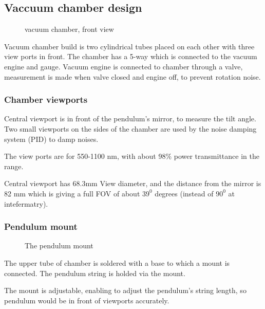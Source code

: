 \documentclass[\main/master.tex]{subfiles}
\begin{document}
\subsection{Vaccuum chamber design}
\begin{figure}[htbp]
	\centering
	\caption[vacuum chamber, front view]{vacuum chamber, front view}
	\label{fig:chamber front}
\end{figure}

\par\noindent
Vacuum chamber build is two cylindrical tubes placed on each other with three view ports in front. The chamber has a 5-way which is connected to the vacuum engine and gauge. Vacuum engine is connected to chamber through a valve, measurement is made when valve closed and engine off, to prevent rotation noise.

\subsubsection{Chamber viewports}
\par\noindent
Central viewport is in front of the pendulum's mirror, to measure the tilt angle. Two small viewports on the sides of the chamber are used by the noise damping system (PID) to damp noises. 
\par\noindent
The view ports are for 550-1100 nm, with about 98$\%$ power transmittance in the range.
\par\noindent
Central viewport has 68.3mm View diameter, and the distance from the mirror is 82 mm which is giving a full FOV of about $39^0$ degrees (instead of $90^0$ at intefermatry).

\subsubsection{Pendulum mount}
\begin{figure}[htbp]
	\centering
	\caption[Pendulum mount]{The pendulum mount}
	\label{fig:mount}
\end{figure}
\FloatBarrier
\par\noindent
The upper tube of chamber is soldered with a base to which a mount is connected. The pendulum string is holded via the mount.
\par\noindent
The mount is adjustable, enabling to adjust the pendulum's string length, so pendulum would be in front of viewports accurately. 
\end{document}
